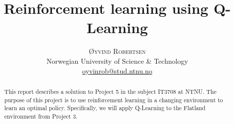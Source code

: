 \documentclass[twoside]{article}
\title{\vspace{-15mm}\fontsize{18pt}{10pt}\selectfont\textbf{Reinforcement learning using Q-Learning}} %
\author{
    \large
    \textsc{Øyvind Robertsen} \\ %
    \normalsize Norwegian University of Science \& Technology \\ %
    \normalsize \href{mailto:oyvinrob@stud.ntnu.no}{oyvinrob@stud.ntnu.no} %
    \vspace{-5mm}
}
\date{}
\begin{document}
\maketitle %

\thispagestyle{fancy} %


\begin{abstract}

    \noindent This report describes a solution to Project 5 in the subject IT3708 at NTNU. 
    The purpose of this project is to use reinforcement learning in a changing environment to learn an optimal policy.
    Specifically, we will apply Q-Learning to the Flatland environment from Project 3.
\end{abstract}

\end{document}
